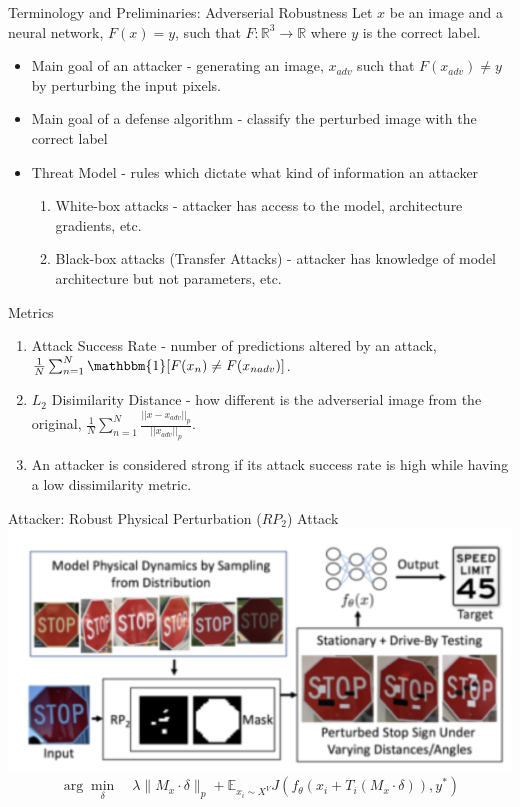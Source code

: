 \documentclass{beamer}
\begin{document}
\begin{frame}{Terminology and Preliminaries: Adverserial Robustness}
	Let $x$ be an image and a neural network, $F(x) = y$, such that $F: \mathbb{R}^{3}\rightarrow \mathbb{R}$ where $y$ is the correct label.
	\begin{itemize}
		\item Main goal of an attacker - generating an image, $x_{adv}$ such that $F(x_{adv}) \neq y$ by perturbing the input pixels.
		\pause
		\item Main goal of a defense algorithm - classify the perturbed image with the correct label
		\pause
		\item Threat Model - rules which dictate what kind of information an attacker
		\begin{enumerate}
			\item White-box attacks - attacker has access to the model, architecture gradients, etc. \pause
			\item Black-box attacks (Transfer Attacks) - attacker has knowledge of model architecture but not parameters, etc.
		\end{enumerate}
	\end{itemize}
\end{frame}

\begin{frame}{Metrics}
	\begin{enumerate}
		\item Attack Success Rate - number of predictions altered by an attack, $\frac{1}{N}\sum_{n=1}^{N} \mathbbm{1}[F(x_n) \neq F(x_{nadv})]$.
		\pause
		\item $L_2$ Disimilarity Distance - how different is the adverserial image from the original, $\frac{1}{N}\sum^{N}_{n=1} \frac{||x - x_{adv}||_{p}}{||x_{adv}||_{p}}.$
		\pause
		\item An attacker is considered strong if its attack success rate is high while having a low dissimilarity metric.
	\end{enumerate}
\end{frame}

\begin{frame}{Attacker: Robust Physical Perturbation ($RP_2$) Attack}
	\centering
	\includegraphics[scale=0.55]{RP2.png}
	\pause
	\begin{equation*}
	\arg \min_\delta \quad \lambda\lVert M_x \cdot \delta \rVert_p + \mathbb{E}_{x_i \sim X^V} J(f_\theta(x_i + T_i(M_x \cdot \delta)), y^*)
	\end{equation*}
\end{frame}
\end{document}
